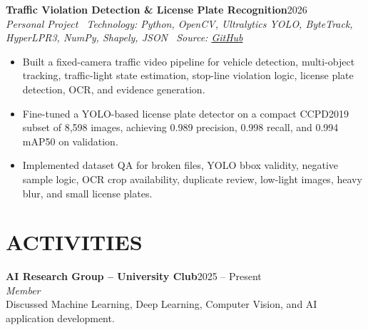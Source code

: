 \documentclass[10pt,a4paper]{article}
\newenvironment{cvitems}{%
    \begin{itemize}[leftmargin=1.25em,itemsep=0pt,topsep=1pt,parsep=0pt]
}{%
    \end{itemize}
}
\newcommand{\entryhead}[2]{%
    \noindent\textbf{#1}\hfill #2\\[-2pt]
}
\newcommand{\entrysub}[1]{%
    \noindent\textit{#1}\\[-1pt]
}
\begin{document}
\entryhead{Traffic Violation Detection \& License Plate Recognition}{2026}
\entrysub{Personal Project \textbar\ Technology: Python, OpenCV, Ultralytics YOLO, ByteTrack, HyperLPR3, NumPy, Shapely, JSON \textbar\ Source: \href{https://github.com/NguyenKhacBao564/Traffic-Violation-Detection-and-License-Plate-Recognition}{GitHub}}
\begin{cvitems}
    \item Built a fixed-camera traffic video pipeline for vehicle detection, multi-object tracking, traffic-light state estimation, stop-line violation logic, license plate detection, OCR, and evidence generation.
    \item Fine-tuned a YOLO-based license plate detector on a compact CCPD2019 subset of 8,598 images, achieving 0.989 precision, 0.998 recall, and 0.994 mAP50 on validation.
    \item Implemented dataset QA for broken files, YOLO bbox validity, negative sample logic, OCR crop availability, duplicate review, low-light images, heavy blur, and small license plates.
\end{cvitems}

\section{ACTIVITIES}
\entryhead{AI Research Group -- University Club}{2025 -- Present}
\entrysub{Member}
Discussed Machine Learning, Deep Learning, Computer Vision, and AI application development.
\end{document}
